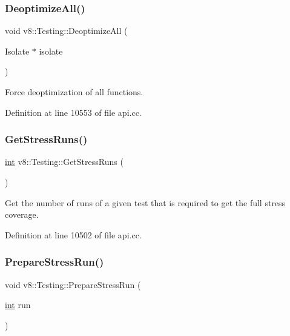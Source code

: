 \subsubsection{\texorpdfstring{Deoptimize\+All()}{DeoptimizeAll()}}
{\footnotesize\ttfamily void v8\+::\+Testing\+::\+Deoptimize\+All (\begin{DoxyParamCaption}\item[{Isolate $\ast$}]{isolate }\end{DoxyParamCaption})\hspace{0.3cm}{\ttfamily [static]}}

Force deoptimization of all functions. 

Definition at line 10553 of file api.\+cc.

\mbox{\label{classv8_1_1Testing_a85ab1c8e52fa31fabbf7c44096cdd070}} 
\subsubsection{\texorpdfstring{Get\+Stress\+Runs()}{GetStressRuns()}}
{\footnotesize\ttfamily \mbox{\hyperlink{classint}{int}} v8\+::\+Testing\+::\+Get\+Stress\+Runs (\begin{DoxyParamCaption}{ }\end{DoxyParamCaption})\hspace{0.3cm}{\ttfamily [static]}}

Get the number of runs of a given test that is required to get the full stress coverage. 

Definition at line 10502 of file api.\+cc.

\mbox{\label{classv8_1_1Testing_aae3f1fc97dc6e4e52a9f4cfef55f8672}} 
\subsubsection{\texorpdfstring{Prepare\+Stress\+Run()}{PrepareStressRun()}}
{\footnotesize\ttfamily void v8\+::\+Testing\+::\+Prepare\+Stress\+Run (\begin{DoxyParamCaption}\item[{\mbox{\hyperlink{classint}{int}}}]{run }\end{DoxyParamCaption})\hspace{0.3cm}{\ttfamily [static]}}

